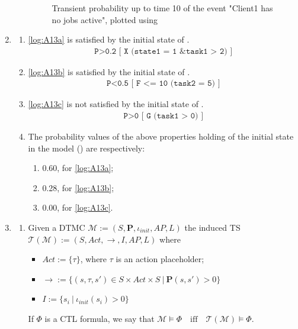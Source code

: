 \documentclass{report}
\begin{document}
\begin{enumerate}
\begin{enumerate}
\begin{figure}[h]
\begin{center}
        \caption{Transient probability up to time 10 of the event "Client1 has no jobs active", plotted using }
        \label{fig:a12d}
      \end{center}
    \end{figure}
  \end{enumerate}
\item
  \begin{enumerate}
  \item \cref{log:A13a} is satisfied by the initial state of .
    \begin{gather} \label{log:A13a}
      \texttt{P>0.2 [ X (state1 = 1 \& task1 > 2) ]} 
    \end{gather}
  \item \cref{log:A13b} is satisfied by the initial state of .
    \begin{gather} \label{log:A13b}
      \texttt{P<0.5 [ F <= 10 (task2 = 5) ]} 
    \end{gather}
  \item \cref{log:A13c} is not satisfied by the initial state of .
    \begin{gather} \label{log:A13c}
      \texttt{P>0 [ G (task1 > 0) ]} 
    \end{gather}
  \item The probability values of the above properties holding of the initial state in the model () are respectively:
    \begin{enumerate}
    \item 0.60, for \cref{log:A13a};
    \item 0.28, for \cref{log:A13b};
    \item 0.00, for \cref{log:A13c}.  
    \end{enumerate}
  \end{enumerate}
  \item
    \begin{enumerate}
    \item Given a DTMC $\mathcal{M}:=(S, \mathbf{P}, \iota_{init}, AP, L)$ the induced TS $\mathcal{T}(\mathcal{M}) := (S, Act, \rightarrow, I, AP, L)$ where
      \begin{itemize}
      \item $Act := \{ \tau \}$, where $\tau$ is an action placeholder;
      \item $\rightarrow := \{(s,\tau,s') \in S \times Act \times S \ \vert \ \mathbf{P}(s,s') > 0 \}$
      \item $I := \{ s_{i} \ \vert \ \iota_{init}(s_{i}) > 0 \}$
      \end{itemize}
      If $\Phi$ is a CTL formula, we say that $\mathcal{M} \models \Phi \quad \text{iff} \quad \mathcal{T}(\mathcal{M}) \models \Phi$.


\end{enumerate}
\end{enumerate}
\end{document}
